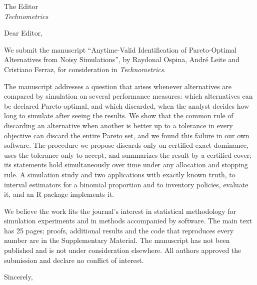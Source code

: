 \documentclass[11pt]{letter}
\begin{document}
\begin{letter}{The Editor\\\textit{Technometrics}}
\opening{Dear Editor,}

We submit the manuscript ``Anytime-Valid Identification of Pareto-Optimal Alternatives from Noisy Simulations'', by Raydonal Ospina, Andr\'e Leite and Cristiano Ferraz, for consideration in \textit{Technometrics}.

The manuscript addresses a question that arises whenever alternatives are compared by simulation on several performance measures: which alternatives can be declared Pareto-optimal, and which discarded, when the analyst decides how long to simulate after seeing the results. We show that the common rule of discarding an alternative when another is better up to a tolerance in every objective can discard the entire Pareto set, and we found this failure in our own software. The procedure we propose discards only on certified exact dominance, uses the tolerance only to accept, and summarizes the result by a certified cover; its statements hold simultaneously over time under any allocation and stopping rule. A simulation study and two applications with exactly known truth, to interval estimators for a binomial proportion and to inventory policies, evaluate it, and an R package implements it.

We believe the work fits the journal's interest in statistical methodology for simulation experiments and in methods accompanied by software. The main text has 25 pages; proofs, additional results and the code that reproduces every number are in the Supplementary Material. The manuscript has not been published and is not under consideration elsewhere. All authors approved the submission and declare no conflict of interest.

\closing{Sincerely,}
\end{letter}
\end{document}
